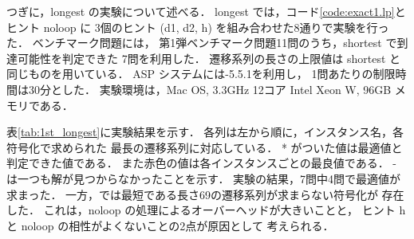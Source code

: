 つぎに，longest の実験について述べる．
longest では，コード\ref{code:exact1.lp}とヒント noloop に
3個のヒント (d1, d2, h) を組み合わせた8通りで実験を行った．
ベンチマーク問題には，%
第1弾ベンチマーク問題11問のうち，shortest で到達可能性を判定できた
7問を利用した．
遷移系列の長さの上限値は shortest と同じものを用いている．
ASP システムには{\clingo}-5.5.1を利用し，
1問あたりの制限時間は30分とした．
実験環境は，Mac OS, 3.3GHz 12コア Intel Xeon W, 96GB メモリである．

表\ref{tab:1st_longest}に実験結果を示す．
各列は左から順に，インスタンス名，各符号化で求められた
最長の遷移系列に対応している．
* がついた値は最適値と判定できた値である．
また赤色の値は各インスタンスごとの最良値である．
- は一つも解が見つからなかったことを示す．
実験の結果，7問中4問で最適値が求まった．
一方，では最短である長さ69の遷移系列が求まらない符号化が
存在した．
これは，noloop の処理によるオーバーヘッドが大きいことと，
ヒント h と noloop の相性がよくないことの2点が原因として
考えられる．